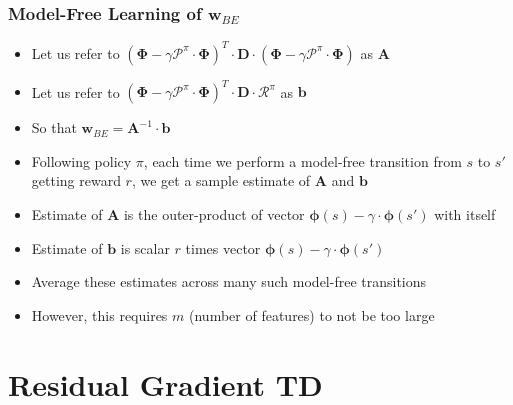 \documentclass[handout]{beamer}
\newcommand{\bphi}{\bm{\Phi}}
\newcommand{\bd}{\bm{D}}
\newcommand{\brew}{\bm{\mathcal{R}}^{\pi}}
\newcommand{\bprob}{\bm{\mathcal{P}}^{\pi}}
\begin{document}
\begin{frame}
\frametitle{Model-Free Learning of $\bm{w}_{BE}$}
\pause
\begin{itemize}[<+->]
\item Let us refer to $(\bphi - \gamma \bprob \cdot \bphi)^T \cdot \bd \cdot (\bphi - \gamma \bprob \cdot \bphi)$ as $\bm{A}$
\item Let us refer to $(\bphi - \gamma \bprob \cdot \bphi)^T \cdot \bd \cdot \brew$ as $\bm{b}$ 
\item So that $\bm{w}_{BE} = \bm{A}^{-1} \cdot \bm{b}$
\item Following policy $\pi$, each time we perform a model-free transition from $s$ to $s'$ getting reward $r$, we get a sample estimate of $\bm{A}$ and $\bm{b}$
\item Estimate of $\bm{A}$ is the outer-product of vector $\bm{\phi}(s) - \gamma \cdot \bm{\phi}(s')$ with itself
\item Estimate of $\bm{b}$ is scalar $r$ times vector $\bm{\phi}(s) - \gamma \cdot \bm{\phi}(s')$ 
\item Average these estimates across many such model-free transitions
\item However, this requires $m$ (number of features) to not be too large
\end{itemize}
\end{frame}


\section{Residual Gradient TD}
\end{document}
